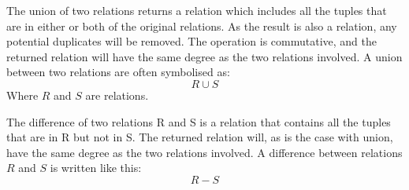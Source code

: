 The union of two relations returns a relation which includes all the tuples that are in either or both of the
original relations. As the result is also a relation, any potential duplicates will be removed. The operation is
commutative, and the returned relation will have the same degree as the two relations involved. A union between
two relations are often symbolised as:
\begin{equation*}
R \cup S
\end{equation*}
Where $R$ and $S$ are relations.

The difference of two relations R and S is a relation that contains all the tuples that are in R but not in S. The
returned relation will, as is the case with union, have the same degree as the
two relations involved. A difference between relations $R$ and $S$ is written like this:
\begin{equation*}
R - S 
\end{equation*}

